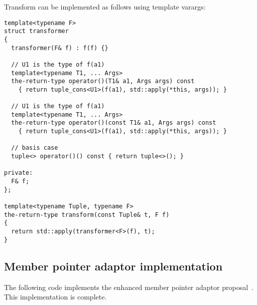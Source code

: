 \documentclass{article}
\begin{document}
Transform can be implemented as follows using template varargs:

\begin{verbatim}
template<typename F>
struct transformer
{
  transformer(F& f) : f(f) {}

  // U1 is the type of f(a1)
  template<typename T1, ... Args>
  the-return-type operator()(T1& a1, Args args) const
    { return tuple_cons<U1>(f(a1), std::apply(*this, args)); }

  // U1 is the type of f(a1)
  template<typename T1, ... Args>
  the-return-type operator()(const T1& a1, Args args) const
    { return tuple_cons<U1>(f(a1), std::apply(*this, args)); }

  // basis case
  tuple<> operator()() const { return tuple<>(); }

private:
  F& f;
};

template<typename Tuple, typename F>
the-return-type transform(const Tuple& t, F f)
{
  return std::apply(transformer<F>(f), t);
}
\end{verbatim}

\subsection{Member pointer adaptor implementation}
\label{mem_fnimpl}
The following code implements the enhanced member pointer adaptor
proposal~\cite{Dimov03a}. This implementation is complete.
\end{document}
